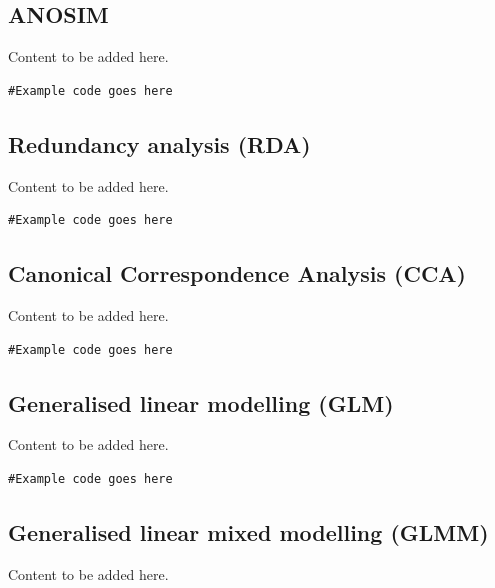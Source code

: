 \documentclass[
]{book}
\begin{document}
\hypertarget{anosim}{%
\subsection{ANOSIM}\label{anosim}}

Content to be added here.

\begin{verbatim}
#Example code goes here
\end{verbatim}

\hypertarget{redundancy-analysis}{%
\subsection{Redundancy analysis (RDA)}\label{redundancy-analysis}}

Content to be added here.

\begin{verbatim}
#Example code goes here
\end{verbatim}

\hypertarget{canonical-correspondence-analysis}{%
\subsection{Canonical Correspondence Analysis (CCA)}\label{canonical-correspondence-analysis}}

Content to be added here.

\begin{verbatim}
#Example code goes here
\end{verbatim}

\hypertarget{generalised-linear-modelling}{%
\subsection{Generalised linear modelling (GLM)}\label{generalised-linear-modelling}}

Content to be added here.

\begin{verbatim}
#Example code goes here
\end{verbatim}

\hypertarget{generalised-linear-mixed-modelling}{%
\subsection{Generalised linear mixed modelling (GLMM)}\label{generalised-linear-mixed-modelling}}

Content to be added here.
\end{document}
